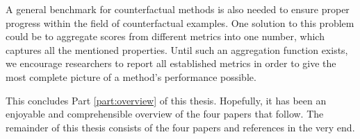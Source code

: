 \documentclass[11pt,a4paper,twoside,openright,final]{memoir}
\makeatletter
\DeclareRobustCommand\onedot{\futurelet\@let@token\@onedot}
\def\@onedot{\ifx\@let@token.\else.\null\fi\xspace}
\def\eg{\emph{e.g}\onedot} \def\Eg{\emph{E.g}\onedot}
\makeatother
\begin{document}
A general benchmark for counterfactual methods is also needed to ensure proper progress within the field of counterfactual examples. 
One solution to this problem could be to aggregate scores from different metrics into one number, which captures all the mentioned properties.
Until such an aggregation function exists, we encourage researchers to report all established metrics in order to give the most complete picture of a method's performance possible.

This concludes Part \ref{part:overview} of this thesis.
Hopefully, it has been an enjoyable and comprehensible overview of the four papers that follow.
The remainder of this thesis consists of the four papers and references in the very end. 

\end{document}
